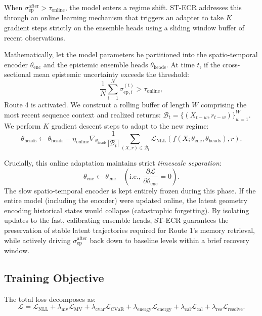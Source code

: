 \documentclass[11pt,a4paper]{article}
\newcommand{\sepa}{\sigma_{\mathrm{ep}}^{\mathrm{after}}}
\newcommand{\Lres}{\mathcal{L}_{\mathrm{resolve}}}
\begin{document}
When $\sepa > \tau_{\mathrm{online}}$, the model enters a regime shift. ST-ECR addresses this through an online learning mechanism that triggers an adapter to take $K$ gradient steps strictly on the ensemble heads using a sliding window buffer of recent observations. 

Mathematically, let the model parameters be partitioned into the spatio-temporal encoder $\theta_{\mathrm{enc}}$ and the epistemic ensemble heads $\theta_{\mathrm{heads}}$. At time $t$, if the cross-sectional mean epistemic uncertainty exceeds the threshold:
\begin{equation}
  \frac{1}{N} \sum_{i=1}^N \sigma_{\mathrm{ep},i}^{(t)} > \tau_{\mathrm{online}},
\end{equation}
Route 4 is activated. We construct a rolling buffer of length $W$ comprising the most recent sequence context and realized returns: $\mathcal{B}_t = \{ (X_{t-w}, r_{t-w}) \}_{w=1}^W$. We perform $K$ gradient descent steps to adapt to the new regime:
\begin{equation}
  \theta_{\mathrm{heads}} \leftarrow \theta_{\mathrm{heads}} - \eta_{\mathrm{online}} \nabla_{\theta_{\mathrm{heads}}} \frac{1}{|\mathcal{B}_t|} \sum_{(X, r) \in \mathcal{B}_t} \mathcal{L}_{\mathrm{NLL}}(f(X; \theta_{\mathrm{enc}}, \theta_{\mathrm{heads}}), r).
\end{equation}

Crucially, this online adaptation maintains strict \emph{timescale separation}:
\begin{equation}
  \theta_{\mathrm{enc}} \leftarrow \theta_{\mathrm{enc}} \quad \left( \text{i.e., } \frac{\partial \mathcal{L}}{\partial \theta_{\mathrm{enc}}} = 0 \right).
\end{equation}
The slow spatio-temporal encoder is kept entirely frozen during this phase. If the entire model (including the encoder) were updated online, the latent geometry encoding historical states would collapse (catastrophic forgetting). By isolating updates to the fast, calibrating ensemble heads, ST-ECR guarantees the preservation of stable latent trajectories required for Route 1's memory retrieval, while actively driving $\sepa$ back down to baseline levels within a brief recovery window.

\subsection{Training Objective}
\label{sec:loss}

The total loss decomposes as:
\begin{equation}
  \mathcal{L} =
    \mathcal{L}_{\mathrm{NLL}}
    + \lambda_{\mathrm{mv}} \mathcal{L}_{\mathrm{MV}}
    + \lambda_{\mathrm{cvar}} \mathcal{L}_{\mathrm{CVaR}}
    + \lambda_{\mathrm{energy}} \mathcal{L}_{\mathrm{energy}}
    + \lambda_{\mathrm{cal}} \mathcal{L}_{\mathrm{cal}}
    + \lambda_{\mathrm{res}} \Lres.
\end{equation}
\end{document}
